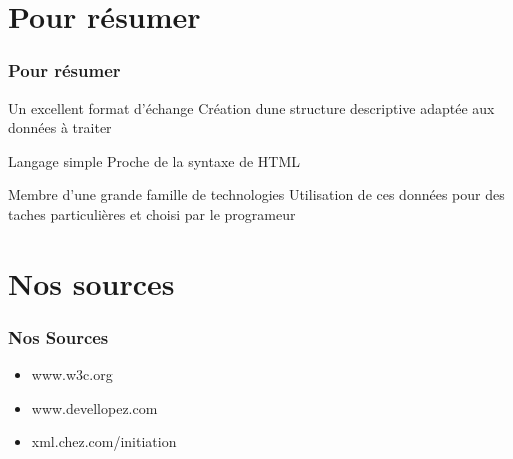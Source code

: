 \documentclass{beamer}
\begin{document}
\section{Pour résumer}
\begin{frame}
\frametitle{Pour résumer}
	\pause
	\begin{block}{Un excellent format d'échange}
	\pause Création dune structure descriptive adaptée aux données à traiter
	\end{block}

	\pause
	\begin{block}{Langage simple}
	\pause Proche de la syntaxe de HTML
	\end{block}

	\pause
	\begin{block}{Membre d'une grande famille de technologies}
	\pause Utilisation de ces données pour des taches particulières et choisi par le programeur
	\end{block}

	
	

\end{frame}

\section{Nos sources}
\begin{frame}
\frametitle{Nos Sources}
	\begin{itemize}
	\item www.w3c.org
	\item www.devellopez.com
	\item xml.chez.com/initiation
	\end{itemize}

	
	

\end{frame}







 
\end{document}
